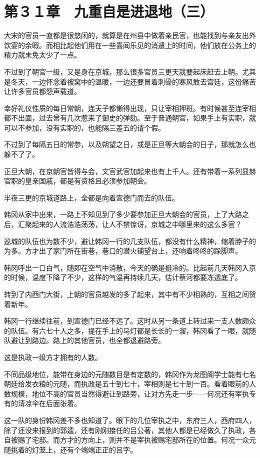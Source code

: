 \section{第３１章　九重自是进退地（三）}

大宋的官员一直都是很悠闲的，就算是在州县中做着亲民官，也能找到与亲友出外饮宴的余暇。而相比起他们用在一些喜闻乐见的消遣上的时间，他们放在公务上的精力就未免太少了一点。

不过到了朝官一级，又是身在京城，那么很多官员三更天就要起床赶去上朝。尤其是冬天，一边怀念着被窝中的温暖，一边还要冒着刺骨的寒风敢去宫廷，这份痛苦让许多官员都怨声载道。

幸好礼仪性质的每日常朝，连天子都懒得出现，只让宰相押班。有时候甚至连宰相都不出面，过去曾有几次惹来了御史的弹劾。至于普通朝官，如果手上有实职，就可以不参加，没有实职的，也能隔三差五的请个假。

不过到了每隔五日的常参，以及朔望之日，或是正旦等大朝会的日子，那就怎么也躲不了了。

正旦大朝，在京朝官皆得与会，文官武官加起来也有上千人。还有带着一系列显赫官职的皇亲国戚，都是有资格且必须参加朝会。

半夜三更的京城道路上，全都是向着宣德门而去的队伍。

韩冈从家中出来，一路上不知见到了多少要参加正旦大朝会的官员，上了大路之后，汇聚起来的人流浩浩荡荡，让人不禁惊讶，京城之中哪里来的这么多官？

巡城的队伍也为数不少，避让韩冈一行的几支队伍，都没有什么精神，缩着脖子的为多。方才出了家门所在街巷，巷口的潜火铺望台上，还响着咚咚的跺脚声。

韩冈呼出一口白气，随即在空气中消散，今天的确是挺冷的。比起前几天韩冈入京的时候，温度下降了不少，这样的气温再持续几天，估计蔡河都要冻透底了。

转到了内西门大街，上朝的官员越发的多了起来，其中有不少相熟的，互相之间贺着新年。

韩冈一行继续往前，到宣德门已经不远了。这时从另一条道上转过来一支人数颇众的队伍。有六七十人之多，提在手上的马灯都是长长的一溜，韩冈看了一眼，就随队避让到路边。路上的其他官员，也全都退避路旁。

这是执政一级方才拥有的人数。

不同品级地位，能带在身边的元随数目是有定数的，韩冈作为龙图阁学士能有七名朝廷给发衣粮的元随，而执政是五十到七十，宰相则是七十到一百。看着眼前的人数规模，地位不高的官员当然得避让到路旁，让对方先走一步——何况还有宰执专有的清凉伞在后面张着。

这一队的身份韩冈差不多也知道了。眼下的几位宰执之中，东府三人，西府四人，除了还没来报到的郭逵，还有刚刚接任的吕公著，其他人都是已经做久了执政，各自被赐了宅邸。而方才的方向上，则并不是宰执被赐宅邸所在的位置。何况一众元随挑着的灯笼上，还有个端端正正的吕字。


